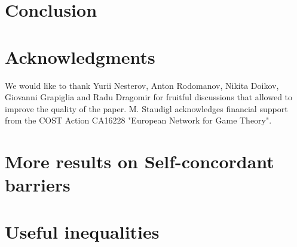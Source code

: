 \documentclass[12pt,fleqn,reqno]{article}
\numberwithin{equation}{section}  %
\newcommand{\0}{\mathbf{0}}
\newcommand{\1}{\mathbf{1}}
\theoremstyle{plain}
\theoremstyle{definition}
\theoremstyle{remark}
\numberwithin{theorem}{section}
\numberwithin{remark}{section}
\numberwithin{example}{section}
\begin{document}
\section{Conclusion}
\label{sec:conclusion}


\section*{Acknowledgments}
We would like to thank Yurii Nesterov, Anton Rodomanov, Nikita Doikov, Giovanni Grapiglia and Radu Dragomir for fruitful discussions that allowed to improve the quality of the paper. M. Staudigl acknowledges financial support from the COST Action CA16228 "European Network for Game Theory".

\appendix
\section{More results on Self-concordant barriers}
\label{app:barrier}


\section{Useful inequalities}
\label{sec:Appendix}




\end{document}
